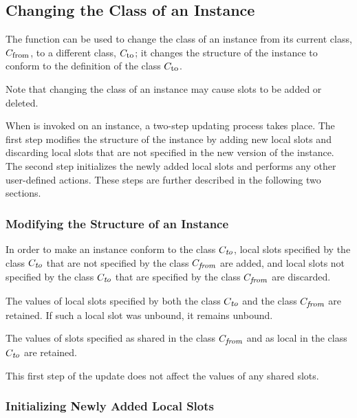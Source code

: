 \subsection{Changing the Class of an Instance}
\label{Changing-the-Class-of-an-Instance-SECTION}

The function  can be used to change the class of an
instance from its current class, $C_{\hbox{{\footnotesize\rm from}}}$, to a
different class, $C_{\hbox{{\footnotesize\rm to}}}$; it changes the
structure of the instance to conform to the definition of the class
$C_{\hbox{{\footnotesize\rm to}}}$.

Note that changing the class of an instance may cause slots to be
added or deleted. 

When  is invoked on an instance, a two-step updating
process takes place.  The first step modifies the structure of
the instance by adding new local slots and discarding local slots that
are not specified in the new version of the instance.  The second step
initializes the newly added local slots and performs any other
user-defined actions. These steps are further described in the
following two sections.

\subsubsection{Modifying the Structure of an Instance}

In order to make an instance conform to the class $C_
{\hbox{{\footnotesize\it to}}}$, local slots specified by the class $C_
{\hbox{{\footnotesize\it to}}}$ that are not specified by the class $C_
{\hbox{{\footnotesize\it from}}}$ are added, and local slots not specified by
the class $C_{\hbox{{\footnotesize\it to}}}$ that are specified by the
class $C_{\hbox{{\footnotesize\it from}}}$ are discarded.

The values of local slots specified by both the class $C_
{\hbox{{\footnotesize\it to}}}$ and the class $C_{\hbox{{\footnotesize\it
from}}}$ are retained. If such a local slot was unbound, it remains
unbound.

The values of slots specified as shared in the class $C_
{\hbox{{\footnotesize\it from}}}$ and as local in the class $C_
{\hbox{{\footnotesize\it to}}}$ are retained.

This first step of the update does not affect the values of any shared
slots.


\subsubsection{Initializing Newly Added Local Slots}

